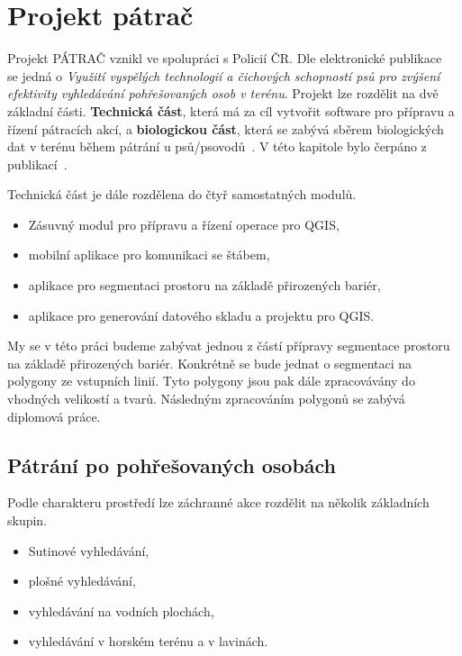 \chapter{Projekt pátrač} 
\label{chap:searchandrescue}

	Projekt PÁTRAČ vznikl ve spolupráci s Policií ČR. Dle elektronické publikace~\cite{chaloupkova2017vyuziti} se jedná o \textit{Využití vyspělých technologií a čichových schopností psů pro zvýšení efektivity vyhledávání pohřešovaných osob v terénu}. Projekt lze rozdělit na dvě základní části. \textbf{Technická část}, která má za cíl vytvořit software pro přípravu a řízení pátracích akcí, a \textbf{biologickou část}, která se zabývá sběrem biologických dat v terénu během pátrání u psů/psovodů~\cite{Zeman2009thesis}. V této kapitole bylo čerpáno z publikací~\cite{sladkova2019aplikace, Zeman2009thesis, pavlista2009rizeni, zachrana}.
	
	Technická část je dále rozdělena do čtyř samostatných modulů.
\begin{itemize}
	\item Zásuvný modul pro přípravu a řízení operace pro QGIS,
	\item mobilní aplikace pro komunikaci se štábem,
	\item aplikace pro segmentaci prostoru na základě přirozených bariér,
	\item aplikace pro generování datového skladu a projektu pro QGIS.
\end{itemize}	
My se v této práci budeme zabývat jednou z částí přípravy segmentace prostoru na základě přirozených bariér. Konkrétně se bude jednat o segmentaci na polygony ze vstupních linií. Tyto polygony jsou pak dále zpracovávány do vhodných velikostí a tvarů. Následným zpracováním polygonů se zabývá diplomová práce.

\section{Pátrání po pohřešovaných osobách}
	Podle charakteru prostředí lze záchranné akce rozdělit na několik základních skupin.
	
\begin{itemize}
	\item Sutinové vyhledávání,
	\item plošné vyhledávání,
	\item vyhledávání na vodních plochách,
	\item vyhledávání v horském terénu a v lavinách.
\end{itemize}	
	
